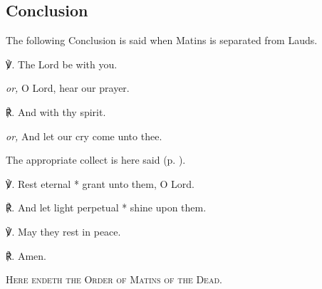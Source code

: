 \subsection{Conclusion}
\begin{rubric}
The following Conclusion is said when Matins is separated from Lauds.
\end{rubric}
℣. The Lord be with you.\par
\textit{or,} O Lord, hear our prayer.

℟. And with thy spirit.\par
\textit{or,} And let our cry come unto thee.

\begin{rubric}
{The appropriate collect is here said (p. \pageref{dead}).}
\end{rubric}

℣. Rest eternal * grant unto them, O Lord.

℟. And let light perpetual * shine upon them.

℣. May they rest in peace.

℟. Amen.

\begin{center}
    \textsc{Here endeth the Order of Matins of the Dead.}
\end{center}